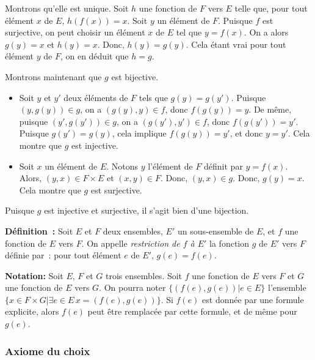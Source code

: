     Montrons qu'elle est unique. 
    Soit $h$ une fonction de $F$ vers $E$ telle que, pour tout élément $x$ de $E$, $h(f(x)) = x$. 
    Soit $y$ un élément de $F$. 
    Puisque $f$ est surjective, on peut choisir un élément $x$ de $E$ tel que $y = f(x)$.
    On a alors $g(y) = x$ et $h(y) = x$. 
    Donc, $h(y) = g(y)$. 
    Cela étant vrai pour tout élément $y$ de $F$, on en déduit que $h = g$.

    Montrons maintenant que $g$ est bijective.
    \begin{itemize}[nosep]
        \item Soit $y$ et $y'$ deux éléments de $F$ tels que $g(y) = g(y')$. 
            Puisque $(y,g(y)) \in g$, on a $(g(y),y) \in f$, donc $f(g(y)) = y$.
            De même, puisque $(y',g(y')) \in g$, on a $(g(y'),y') \in f$, donc $f(g(y')) = y'$.
            Puisque $g(y') = g(y)$, cela implique $f(g(y)) = y'$, et donc $y = y'$.
            Cela montre que $g$ est injective.
        \item Soit $x$ un élément de $E$. 
            Notons $y$ l'élément de $F$ définit par $y = f(x)$.
            Alors, $(y,x) \in F \times E$ et $(x,y) \in F$. 
            Donc, $(y,x) \in g$.
            Donc, $g(y) = x$.
            Cela montre que $g$ est surjective.
    \end{itemize}
    Puisque $g$ est injective et surjective, il s'agit bien d'une bijection.

   \done 

\medskip

\noindent\textbf{Définition :} Soit $E$ et $F$ deux ensembles, $E'$ un sous-ensemble de $E$, et $f$ une fonction de $E$ vers $F$. 
    On appelle \textit{restriction de $f$ à $E'$} la fonction $g$ de $E'$ vers $F$ définie par : pour tout élément $e$ de $E'$, $g(e) = f(e)$.

\medskip

\noindent\textbf{Notation:} Soit $E$, $F$ et $G$ trois ensembles. 
    Soit $f$ une fonction de $E$ vers $F$ et $G$ une fonction de $E$ vers $G$.
    On pourra noter $\lbrace (f(e), g(e)) \vert e \in E \rbrace$ l'ensemble $\lbrace x \in F \times G \vert \exists e \in E \, x = (f(e), g(e)) \rbrace$. 
    Si $f(e)$ est donnée par une formule explicite, alors $f(e)$ peut être remplacée par cette formule, et de même pour $g(e)$.

\subsubsection{Axiome du choix}

